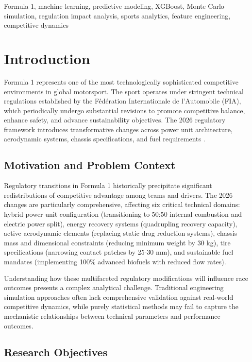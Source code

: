\documentclass[conference]{IEEEtran}
\begin{document}
\begin{IEEEkeywords}
Formula 1, machine learning, predictive modeling, XGBoost, Monte Carlo simulation, regulation impact analysis, sports analytics, feature engineering, competitive dynamics
\end{IEEEkeywords}

\section{Introduction}

Formula 1 represents one of the most technologically sophisticated competitive environments in global motorsport. The sport operates under stringent technical regulations established by the F\'ed\'eration Internationale de l'Automobile (FIA), which periodically undergo substantial revisions to promote competitive balance, enhance safety, and advance sustainability objectives. The 2026 regulatory framework introduces transformative changes across power unit architecture, aerodynamic systems, chassis specifications, and fuel requirements \cite{fia2026regs}.

\subsection{Motivation and Problem Context}

Regulatory transitions in Formula 1 historically precipitate significant redistributions of competitive advantage among teams and drivers. The 2026 changes are particularly comprehensive, affecting six critical technical domains: hybrid power unit configuration (transitioning to 50:50 internal combustion and electric power split), energy recovery systems (quadrupling recovery capacity), active aerodynamic elements (replacing static drag reduction systems), chassis mass and dimensional constraints (reducing minimum weight by 30 kg), tire specifications (narrowing contact patches by 25-30 mm), and sustainable fuel mandates (implementing 100\% advanced biofuels with reduced flow rates).

Understanding how these multifaceted regulatory modifications will influence race outcomes presents a complex analytical challenge. Traditional engineering simulation approaches often lack comprehensive validation against real-world competitive dynamics, while purely statistical methods may fail to capture the mechanistic relationships between technical parameters and performance outcomes.

\subsection{Research Objectives}
\end{document}
